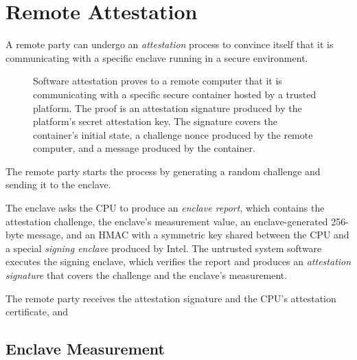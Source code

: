 \section{Remote Attestation}
\label{sec:attestation}

A remote party can undergo an \textit{attestation} process to convince itself
that it is communicating with a specific enclave running in a secure
environment.

\begin{figure}[hbt]
  \caption{
    Software attestation proves to a remote computer that it is communicating
    with a specific secure container hosted by a trusted platform. The proof is
    an attestation signature produced by the platform's secret attestation key.
    The signature covers the container's initial state, a challenge nonce
    produced by the remote computer, and a message produced by the container.
  }
  \label{fig:generic_attestation}
\end{figure}


The remote party starts the process by generating a random
challenge and sending it to the enclave.

The enclave asks the CPU to produce an \textit{enclave report}, which contains
the attestation challenge, the enclave's measurement value, an
enclave-generated 256-byte message, and an HMAC
 with a symmetric key shared between the CPU and a special
\textit{signing enclave} produced by Intel. The untrusted system software
executes the signing enclave, which verifies the report and produces an
\textit{attestation signature} that covers the challenge and the enclave's
measurement.

The remote party receives the attestation signature and the CPU's attestation
certificate, and

\subsection{Enclave Measurement}
\label{sec:measurement}

